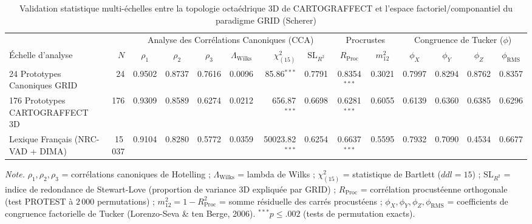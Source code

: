 
\begin{table}[htbp]
\centering
\begin{threeparttable}
\caption{Validation statistique multi-échelles entre la topologie octaédrique 3D de CARTOGRAFFECT et l'espace factoriel/componantiel du paradigme GRID (Scherer)}
\label{tab:cartograffect_grid_multiscale_validation}
\small
\begin{tabular}{l r ccc c r c cc cccc}
\toprule
 & & \multicolumn{6}{c}{Analyse des Corrélations Canoniques (CCA)} & \multicolumn{2}{c}{Procrustes} & \multicolumn{4}{c}{Congruence de Tucker ($\phi$)} \\
\cmidrule(lr){3-8} \cmidrule(lr){9-10} \cmidrule(l){11-14}
Échelle d'analyse & $N$ & $\rho_1$ & $\rho_2$ & $\rho_3$ & $\Lambda_{\text{Wilks}}$ & $\chi^2_{(15)}$ & $\text{SL}_{R^2}$ & $R_{\text{Proc}}$ & $m_{12}^2$ & $\phi_X$ & $\phi_Y$ & $\phi_Z$ & $\phi_{\text{RMS}}$ \\
\midrule
24 Prototypes Canoniques GRID & 24 & 0.9502 & 0.8737 & 0.7616 & 0.0096 & 85.86$^{***}$ & 0.7791 & 0.8354$^{***}$ & 0.3021 & 0.7997 & 0.8294 & 0.8762 & 0.8357 \\
176 Prototypes CARTOGRAFFECT 3D & 176 & 0.9309 & 0.8589 & 0.6274 & 0.0212 & 656.87$^{***}$ & 0.6698 & 0.6281$^{***}$ & 0.6055 & 0.6139 & 0.6360 & 0.6385 & 0.6296 \\
Lexique Français (NRC-VAD + DIMA) & 15\,037 & 0.9104 & 0.8280 & 0.5772 & 0.0359 & 50023.82$^{***}$ & 0.6254 & 0.6637$^{***}$ & 0.5595 & 0.7932 & 0.7090 & 0.4534 & 0.6677 \\
\bottomrule
\end{tabular}
\begin{tablenotes}
\footnotesize
\textit{Note.} $\rho_1, \rho_2, \rho_3$ = corrélations canoniques de Hotelling ; $\Lambda_{\text{Wilks}}$ = lambda de Wilks ; $\chi^2_{(15)}$ = statistique de Bartlett ($ddl = 15$) ; $\text{SL}_{R^2}$ = indice de redondance de Stewart-Love (proportion de variance 3D expliquée par GRID) ; $R_{\text{Proc}}$ = corrélation procustéenne orthogonale (test PROTEST à $2\,000$ permutations) ; $m_{12}^2 = 1 - R_{\text{Proc}}^2$ = somme résiduelle des carrés procustéens ; $\phi_X, \phi_Y, \phi_Z, \phi_{\text{RMS}}$ = coefficients de congruence factorielle de Tucker (Lorenzo-Seva \& ten Berge, 2006). $^{***}p \le .002$ (tests de permutation exacts).
\end{tablenotes}
\end{threeparttable}
\end{table}

